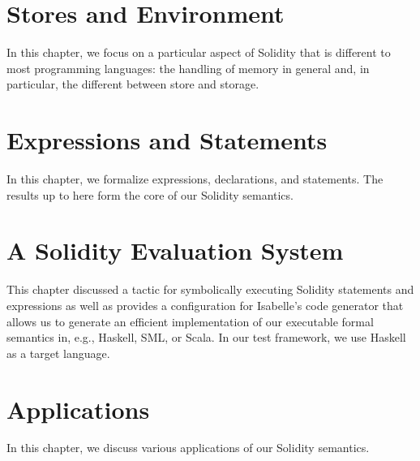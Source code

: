 \documentclass[10pt,DIV17,a4paper,abstract=true,twoside=semi,openright]
{scrreprt}
\begin{document}


\chapter{Stores and Environment}
In this chapter, we focus on a particular aspect of Solidity that is
different to most programming languages: the handling of memory in
general and, in particular, the different between store and storage.




\chapter{Expressions and Statements}

In this chapter, we formalize expressions, declarations, and
statements. The results up to here form the core of our Solidity
semantics. 




\chapter{A Solidity Evaluation System}
This chapter discussed a tactic for symbolically executing Solidity statements
and expressions as well as provides a configuration for Isabelle's code
generator that allows us to generate an efficient implementation of our
executable formal semantics in, e.g., Haskell, SML, or Scala. In our test
framework, we use Haskell as a target language.



\chapter{Applications}
In this chapter, we discuss various applications of our Solidity
semantics.




\end{document}
